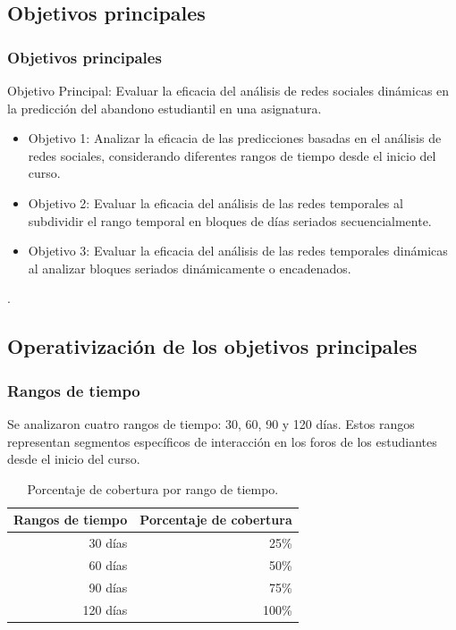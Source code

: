 \documentclass{beamer}
\begin{document}
\subsection{Objetivos principales}
\begin{frame}
	\frametitle{Objetivos principales}
	\begin{block}{Objetivo Principal: Evaluar la eficacia del análisis de redes sociales dinámicas en la predicción del abandono estudiantil en una asignatura.}
		\begin{itemize}
			\item  Objetivo 1: Analizar la eficacia de las predicciones basadas en el análisis de redes sociales, considerando diferentes rangos de tiempo desde el inicio del curso.
					
			\item  Objetivo 2: Evaluar la eficacia del análisis de las redes temporales al subdividir el rango temporal en bloques de días seriados secuencialmente.
			
			\item  	Objetivo 3: Evaluar la eficacia del análisis de las redes temporales dinámicas al analizar bloques seriados dinámicamente o encadenados.
					
		\end{itemize}. 
	\end{block}
\end{frame}

\subsection{Operativización de los objetivos principales}
\begin{frame}
	\frametitle{Rangos de tiempo}
	Se analizaron cuatro rangos de tiempo: 30, 60, 90 y 120 días. Estos rangos representan segmentos específicos de interacción en los foros de los estudiantes desde el inicio del curso. 
	\begin{table}[H]
		\centering
		\begin{tabular}{rr}
			\toprule
			Rangos de tiempo & Porcentaje de cobertura \\
			\midrule
			30 días & 25\% \\
			60 días & 50\% \\
			90 días & 75\% \\
			120 días & 100\% \\
			\bottomrule
		\end{tabular}
		\caption{Porcentaje de cobertura por rango de tiempo.}
		\label{tab:subdivision-porcentaje1}
	\end{table}
\end{frame}
\end{document}
